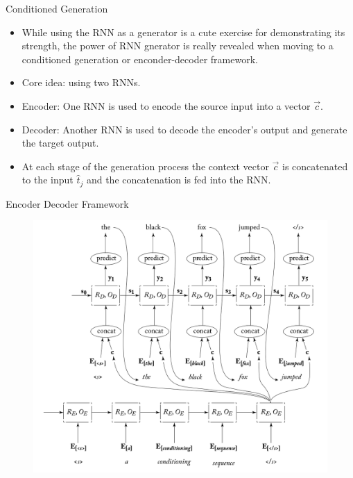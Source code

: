 \begin{frame}{Conditioned Generation}
\begin{scriptsize}
\begin{itemize}
\item While using the RNN as a generator is a cute exercise for demonstrating its strength, the power of RNN gnerator is really revealed when moving to a conditioned generation or enconder-decoder framework.
\item Core idea: using two RNNs.
\item Encoder: One RNN is used to encode the source input into a vector $\overrightarrow{c}$.
\item Decoder: Another RNN is used to decode the encoder's output and generate the target output.
\item At each stage of the generation process the context vector $\overrightarrow{c}$ is concatenated to the input $\hat{t}_j$ and the concatenation is fed into the RNN.
\end{itemize}
\end{scriptsize}
\end{frame}


\begin{frame}{Encoder Decoder Framework}
         \begin{figure}[h]
        	\includegraphics[scale = 0.32]{pics/seqseq.png}
        \end{figure}  
\end{frame}




